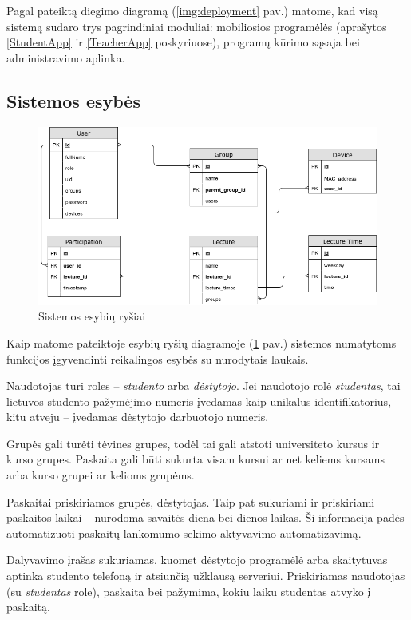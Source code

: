 \documentclass{VUMIFPSbakalaurinis}
\begin{document}
Pagal pateiktą diegimo diagramą (\ref{img:deployment} pav.) matome, kad visą sistemą sudaro trys pagrindiniai moduliai: mobiliosios programėlės (aprašytos \ref{StudentApp} ir \ref{TeacherApp} poskyriuose), programų kūrimo sąsaja bei administravimo aplinka.

\subsection{Sistemos esybės}

\begin{figure}[H]
	\centering
	\includegraphics[scale=0.5]{img/Bakalauro-ER.png}
	\caption{Sistemos esybių ryšiai}
	\label{img:er-diagram}
\end{figure}

Kaip matome pateiktoje esybių ryšių diagramoje (\ref{img:er-diagram} pav.) sistemos numatytoms funkcijos įgyvendinti reikalingos esybės su nurodytais laukais.

Naudotojas turi roles – \textit{studento} arba \textit{dėstytojo}. Jei naudotojo rolė \textit{studentas}, tai lietuvos studento pažymėjimo numeris įvedamas kaip unikalus identifikatorius, kitu atveju – įvedamas dėstytojo darbuotojo numeris.

Grupės gali turėti tėvines grupes, todėl tai gali atstoti universiteto kursus ir kurso grupes. Paskaita gali būti sukurta visam kursui ar net keliems kursams arba kurso grupei ar kelioms grupėms.

Paskaitai priskiriamos grupės, dėstytojas. Taip pat sukuriami ir priskiriami paskaitos laikai – nurodoma savaitės diena bei dienos laikas. Ši informacija padės automatizuoti paskaitų lankomumo sekimo aktyvavimo automatizavimą.

Dalyvavimo įrašas sukuriamas, kuomet dėstytojo programėlė arba skaitytuvas aptinka studento telefoną ir atsiunčią užklausą serveriui. Priskiriamas naudotojas (su \textit{studentas} role), paskaita bei pažymima, kokiu laiku studentas atvyko į paskaitą.
\end{document}
